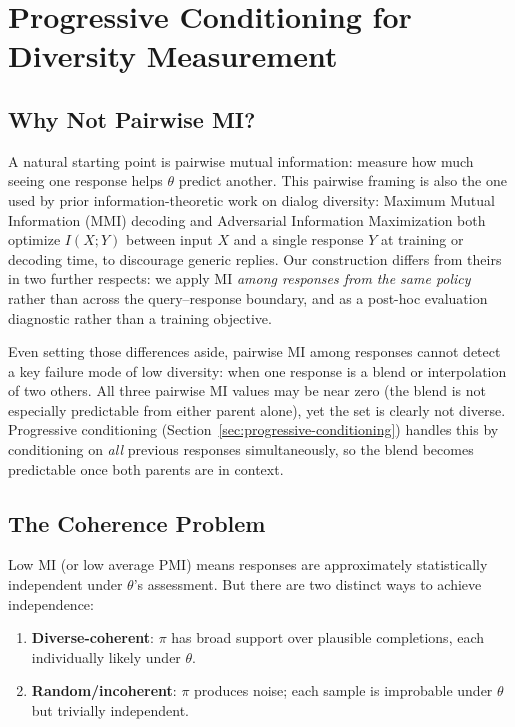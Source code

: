 \section{Progressive Conditioning for Diversity Measurement}

\subsection{Why Not Pairwise MI?}\label{sec:pairwise-mi}

A natural starting point is pairwise mutual information: measure how much seeing one response helps $\theta$ predict another.
This pairwise framing is also the one used by prior information-theoretic work on dialog diversity: Maximum Mutual Information (MMI) decoding \citep{li2016diversity} and Adversarial Information Maximization \citep{zhang2018aim} both optimize $I(X;Y)$ between input $X$ and a single response $Y$ at training or decoding time, to discourage generic replies.
Our construction differs from theirs in two further respects: we apply MI \emph{among responses from the same policy} rather than across the query–response boundary, and as a post-hoc evaluation diagnostic rather than a training objective.

Even setting those differences aside, pairwise MI among responses cannot detect a key failure mode of low diversity: when one response is a blend or interpolation of two others.
All three pairwise MI values may be near zero (the blend is not especially predictable from either parent alone), yet the set is clearly not diverse.
Progressive conditioning (Section~\ref{sec:progressive-conditioning}) handles this by conditioning on \emph{all} previous responses simultaneously, so the blend becomes predictable once both parents are in context.

\subsection{The Coherence Problem}\label{sec:coherence-problem}

Low MI (or low average PMI) means responses are approximately statistically independent under $\theta$'s assessment.
But there are two distinct ways to achieve independence:
\begin{enumerate}[nosep]
    \item \textbf{Diverse-coherent}: $\pi$ has broad support over plausible completions, each individually likely under $\theta$.
    \item \textbf{Random/incoherent}: $\pi$ produces noise; each sample is improbable under $\theta$ but trivially independent.
\end{enumerate}

